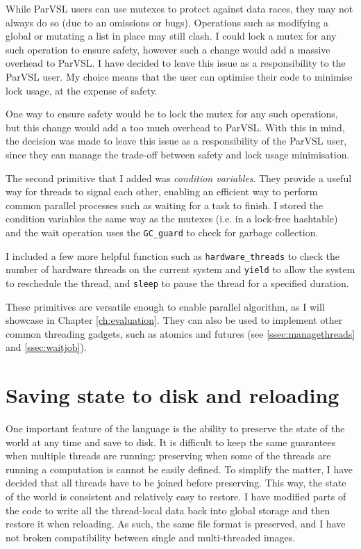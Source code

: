 While ParVSL users can use mutexes to protect against data races, they may not always do so
(due to an omissions or bugs). Operations such as modifying a global or mutating a list in place
may still clash.
I could lock a mutex for any such operation to ensure safety, however such a change would add a massive overhead to ParVSL.
I have decided to leave this issue as a responsibility to the ParVSL user.
My choice means that the user can optimise their code to minimise lock usage, at the expense of safety.

One way to ensure safety would be to lock the mutex for any such operations, but this change would add a
too much overhead to ParVSL. With this in mind, the decision was made to leave this issue as a responsibility
of the ParVSL user, since they can manage the trade-off between safety and lock usage minimisation.

The second primitive that I added was \emph{condition variables}. They provide a useful way for
threads to signal each other, enabling an efficient way to perform common parallel processes such as
waiting for a task to finish. I stored the condition variables the same way as the mutexes (i.e. in a lock-free
hashtable) and the wait operation uses the \verb|GC_guard| to check for garbage collection.

I included a few more helpful function such as \verb|hardware_threads| to check the number of hardware
threads on the current system and \verb|yield| to allow the system to reschedule the thread, and
\verb|sleep| to pause the thread for a specified duration.

These primitives are versatile enough to enable parallel algorithm, as I will showcase in Chapter \ref{ch:evaluation}.
They can also be used to implement other common threading gadgets, such as atomics and futures
(see \ref{ssec:managethreads} and \ref{ssec:waitjob}).

\section{Saving state to disk and reloading}
\label{sec:preserve}

One important feature of the language is the ability to preserve the state of the world at any
time and save to disk. It is difficult to keep the same guarantees when multiple threads are running:
preserving when some of the threads are running a computation is cannot be easily defined. To simplify the
matter, I have decided that all threads have to be joined before preserving. This way, the state of
the world is consistent and relatively easy to restore. I have modified parts of the code to write
all the thread-local data back into global storage and then restore it when reloading. As such, the same
file format is preserved, and I have not broken compatibility between single and multi-threaded images.

